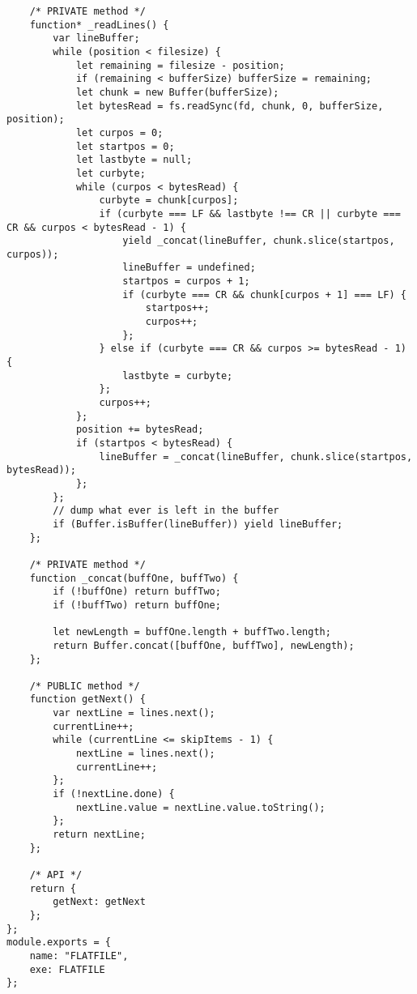 \begin{verbatim}
    /* PRIVATE method */
    function* _readLines() {
        var lineBuffer;
        while (position < filesize) {
            let remaining = filesize - position;
            if (remaining < bufferSize) bufferSize = remaining;
            let chunk = new Buffer(bufferSize);
            let bytesRead = fs.readSync(fd, chunk, 0, bufferSize, position);
            let curpos = 0;
            let startpos = 0;
            let lastbyte = null;
            let curbyte;
            while (curpos < bytesRead) {
                curbyte = chunk[curpos];
                if (curbyte === LF && lastbyte !== CR || curbyte === CR && curpos < bytesRead - 1) {
                    yield _concat(lineBuffer, chunk.slice(startpos, curpos));
                    lineBuffer = undefined;
                    startpos = curpos + 1;
                    if (curbyte === CR && chunk[curpos + 1] === LF) {
                        startpos++;
                        curpos++;
                    };
                } else if (curbyte === CR && curpos >= bytesRead - 1) {
                    lastbyte = curbyte;
                };
                curpos++;
            };
            position += bytesRead;
            if (startpos < bytesRead) {
                lineBuffer = _concat(lineBuffer, chunk.slice(startpos, bytesRead));
            };
        };
        // dump what ever is left in the buffer
        if (Buffer.isBuffer(lineBuffer)) yield lineBuffer;
    };

    /* PRIVATE method */
    function _concat(buffOne, buffTwo) {
        if (!buffOne) return buffTwo;
        if (!buffTwo) return buffOne;

        let newLength = buffOne.length + buffTwo.length;
        return Buffer.concat([buffOne, buffTwo], newLength);
    };

    /* PUBLIC method */
    function getNext() {
        var nextLine = lines.next();
        currentLine++;
        while (currentLine <= skipItems - 1) {
            nextLine = lines.next();
            currentLine++;
        };
        if (!nextLine.done) {
            nextLine.value = nextLine.value.toString();
        };
        return nextLine;
    };

    /* API */
    return {
        getNext: getNext
    };
};
module.exports = {
    name: "FLATFILE",
    exe: FLATFILE
};
\end{verbatim}


